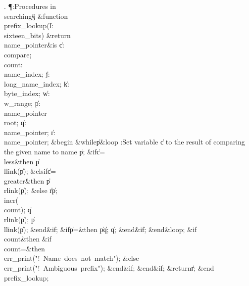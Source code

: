 . \P\?:Procedures in \\{searching}\X\mathrel{+}\S\?\6
\&{function}\8\1\\{prefix\_lookup}\?(\1\?\|l\?:\?\\{sixteen\_bits}\?\2)%
\&{return}\?\8\\{name\_pointer}\2\8\&{is}\8\1\6
\|c\?:\?\\{compare};\6
\\{count}\?:\?\\{name\_index}\?\K{};\6
\|j\?:\?\\{long\_name\_index};\6
\|k\?:\?\\{byte\_index};\6
\|w\?:\?\\{w\_range};\6
\|p\?:\?\\{name\_pointer}\?\K\?\\{root};\6
\|q\?:\?\\{name\_pointer}\?\K{};\6
\|r\?:\?\\{name\_pointer}\?\K{};\6
\4\&{begin}\6
\1\&{while}\8\|p\?\I{}\8\&{loop}\6
:Set variable \|c to the result of comparing the given name to name \|p\X;\6
\&{if}\1\1\8\|c\?=\?\\{less}\2\8\&{then}\6
\|p\?\K\?\\{llink}\?\1(\?\|p\?\2)\?;\6
\4\&{elsif}\1\8\|c\?=\?\\{greater}\2\8\&{then}\6
\|p\?\K\?\\{rlink}\?\1(\?\|p\?\2)\?;\6
\4\&{else}\6
\|r\?\K\?\|p;\5
\\{incr}\?\1(\?\\{count}\?\2)\?;\5
\|q\?\K\?\\{rlink}\?\1(\?\|p\?\2)\?;\5
\|p\?\K\?\\{llink}\?\1(\?\|p\?\2)\?;\2\6
\&{end}\8\2\&{if}\1;\6
\&{if}\1\1\8\|p\?=\2\8\&{then}\6
\|p\?\K\?\|q;\5
\|q\?\K{};\2\6
\&{end}\8\2\&{if}\1;\2\6
\&{end}\8\&{loop};\6
\&{if}\1\1\8\\{count}\?\I{}\2\8\&{then}\6
\&{if}\1\1\8\\{count}\?=\2\8\&{then}\6
\\{err\_print}\?\1(\?\.{"!\ Name\ does\ not\ match"}\?\2)\?;\6
\4\&{else}\6
\\{err\_print}\?\1(\?\.{"!\ Ambiguous\ prefix"}\?\2)\?;\2\6
\&{end}\8\2\&{if}\1;\2\6
\&{end}\8\2\&{if}\1;\6
\?\&{return}\?\8\|r;\2\6
\&{end}\8\\{prefix\_lookup};\par
\fi

